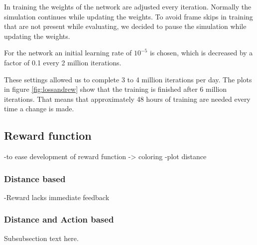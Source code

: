 In training the weights of the network are adjusted every iteration. Normally the simulation continues while updating the weights. To avoid frame skips in training that are not present while evaluating, we decided to pause the simulation while updating the weights.

For the network an initial learning rate of $10^{-5}$ is chosen, which is decreased by a factor of 0.1 every 2 million iterations.

These settings allowed us to complete 3 to 4 million iterations per day. The plots in figure \ref{fig:lossandrew} show that the training is finished after 6 million iterations. That means that approximately 48 hours of training are needed every time a change is made.

 

\subsection{Reward function}
-to ease development of reward function -> coloring
-plot distance 

\subsubsection{Distance based}
-Reward lacks immediate feedback
\subsubsection{Distance and Action based}
Subsubsection text here.